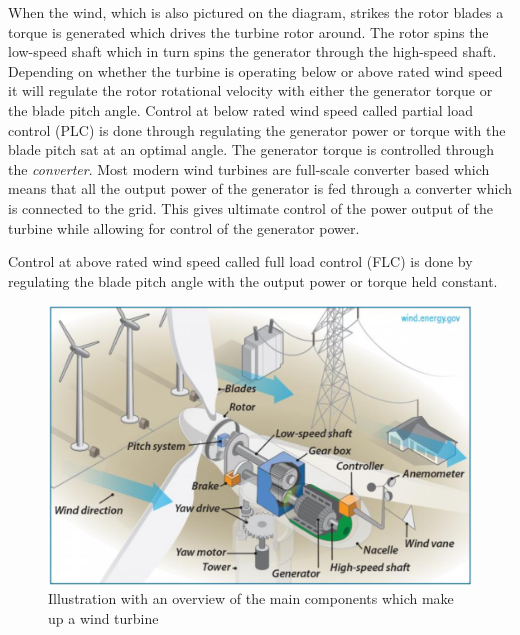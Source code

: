 When the wind, which is also pictured on the diagram, strikes the rotor blades a torque is generated which drives the turbine rotor around. The rotor spins the low-speed shaft which in turn spins the generator through the high-speed shaft. Depending on whether the turbine is operating below or above rated wind speed it will regulate the rotor rotational velocity with either the generator torque or the blade pitch angle. Control at below rated wind speed called partial load control (PLC) is done through regulating the generator power or torque with the blade pitch sat at an optimal angle. The generator torque is controlled through the \textit{converter}. Most modern wind turbines are full-scale converter based which means that all the output power of the generator is fed through a converter which is connected to the grid. This gives ultimate control of the power output of the turbine while allowing for control of the generator power. 

Control at above rated wind speed called full load control (FLC) is done by regulating the blade pitch angle with the output power or torque held constant.
\begin{figure}[ht]
	\centering
	\includegraphics[width=0.7\linewidth]{Graphics/WtComponents.png}
	\caption{Illustration with an overview of the main components which make up a wind turbine}
	\label{fig:wt_components}
\end{figure}

